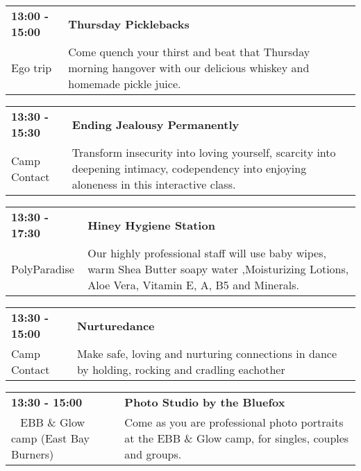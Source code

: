 \begin{tabular}{ p{1in} p{2.2in} }
    \textbf{13:00 - 15:00} & \textbf{Thursday Picklebacks} \\
    Ego trip \newline  & Come quench your thirst and beat that Thursday morning hangover with our delicious whiskey and homemade pickle juice. \\
    \hline 
\end{tabular}
    
\begin{tabular}{ p{1in} p{2.2in} }
    \textbf{13:30 - 15:30} & \textbf{Ending Jealousy Permanently} \\
    Camp Contact \newline  & Transform insecurity into loving yourself, scarcity into deepening intimacy, codependency into enjoying aloneness in this interactive class. \\
    \hline 
\end{tabular}
    
\begin{tabular}{ p{1in} p{2.2in} }
    \textbf{13:30 - 17:30} & \textbf{Hiney Hygiene Station} \\
    PolyParadise \newline  & Our highly professional staff  will use baby wipes, warm Shea Butter soapy water ,Moisturizing Lotions, Aloe Vera, Vitamin E, A, B5 and Minerals. \\
    \hline 
\end{tabular}
    
\begin{tabular}{ p{1in} p{2.2in} }
    \textbf{13:30 - 15:00} & \textbf{Nurturedance} \\
    Camp Contact \newline  & Make safe, loving and nurturing connections in dance by holding, rocking and cradling eachother \\
    \hline 
\end{tabular}
    
\begin{tabular}{ p{1in} p{2.2in} }
    \textbf{13:30 - 15:00} & \textbf{Photo Studio by the Bluefox} \\
    ~ \newline EBB \& Glow camp (East Bay Burners) & Come as you are professional photo portraits at the EBB \& Glow camp, for singles, couples and groups. \\
    \hline 
\end{tabular}
    
